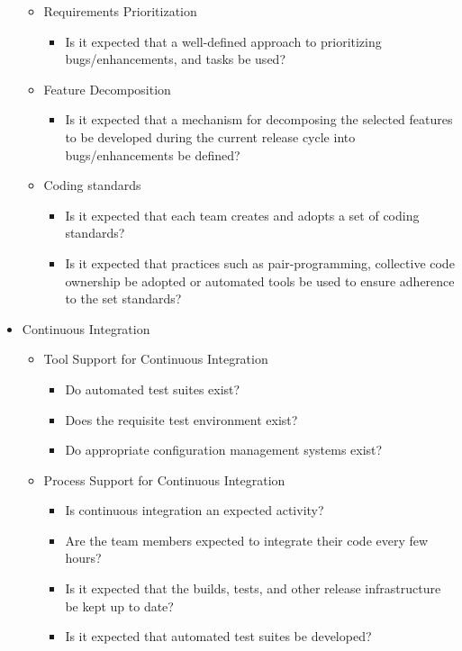 \begin{appendices}
\begin{itemize}
\begin{itemize}
\begin{itemize}
				\end{itemize}
			\item Requirements Prioritization
				\begin{itemize}
					\item Is it expected that a well-defined approach to prioritizing bugs/enhancements, and tasks be used?
				\end{itemize}	
			\item Feature Decomposition
				\begin{itemize}
					\item Is it expected that a mechanism for decomposing the selected features to be developed during the current release cycle into bugs/enhancements be defined?
				\end{itemize}
			\item Coding standards
				\begin{itemize}
					\item Is it expected that each team creates and adopts a set of coding standards?
					\item Is it expected that practices such as pair-programming, collective code ownership be adopted or automated tools be used to ensure adherence to the set standards?
				\end{itemize}
		\end{itemize}
	\item Continuous Integration
		\begin{itemize}
			\item Tool Support for Continuous Integration
				\begin{itemize}
					\item Do automated test suites exist?
					\item Does the requisite test environment exist?
					\item Do appropriate configuration management systems exist?
				\end{itemize}
			\item Process Support for Continuous Integration
				\begin{itemize}
					\item Is continuous integration an expected activity?
					\item Are the team members expected to integrate their code every few hours?
					\item Is it expected that the builds, tests, and other release infrastructure be kept up to date?
					\item Is it expected that automated test suites be developed?

\end{itemize}
\end{itemize}
\end{itemize}
\end{appendices}
